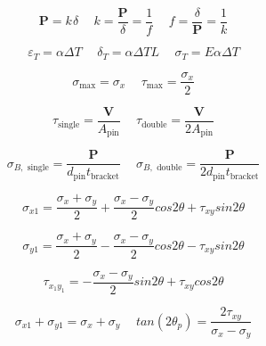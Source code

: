 \documentclass[twocolumn, 12pt]{article}
\begin{document}
{\begin{equation*}
    \textbf{P}=\textit{k}\hspace{1pt} \delta  \hspace{15pt} \textit{k}=\frac{\textbf{P}}{\delta}=\frac{1}{f} \hspace{15pt} f=\frac{\delta}{\textbf{P} }=\frac{1}{\textit{k}} 
\end{equation*}

\begin{equation*}
    \varepsilon_T=\alpha\Delta T \hspace{15pt} \delta_T=\alpha\Delta TL \hspace{15pt} \sigma_T=E\alpha\Delta T
\end{equation*}

\begin{equation*}
    \sigma_{\text{max}}=\sigma_x \hspace{15pt} \tau_{\text{max}}=\frac{\sigma_x}{2}
\end{equation*}

\begin{equation*}
    \tau_{\text{single}}=\frac{\textbf{V}}{A_{\text{pin}}} \hspace{15pt} \tau_{\text{double}}=\frac{\textbf{V}}{2A_{\text{pin}}}
\end{equation*}

\begin{equation*}
    \sigma_{B,\text{ single}}=\frac{\textbf{P}}{d_{\text{pin}}t_{\text{bracket}}} \hspace{15pt} \sigma_{B,\text{ double}}= \frac{\textbf{P}}{2d_{\text{pin}}t_{\text{bracket}} }
\end{equation*}

\begin{equation*}
    \sigma_{x1} =\frac{\sigma_x+\sigma_y}{2} + \frac{\sigma_x-\sigma_y}{2} cos2\theta +\tau_{xy}sin2\theta
\end{equation*}
  
\begin{equation*}
    \sigma_{y1} =\frac{\sigma_x+\sigma_y}{2} - \frac{\sigma_x-\sigma_y}{2} cos2\theta -\tau_{xy}sin2\theta
\end{equation*}

\begin{equation*}
    \tau_{x_1y_1} =-\frac{\sigma_x-\sigma_y}{2} sin2\theta +\tau_{xy}cos2\theta
\end{equation*}

\begin{equation*}
    \sigma_{x1}+\sigma_{y1}=\sigma_x+\sigma_y \hspace{15pt} tan(2\theta_p)= \frac{2\tau_{xy}}{\sigma_x-\sigma_y}
\end{equation*}

}
\end{document}
